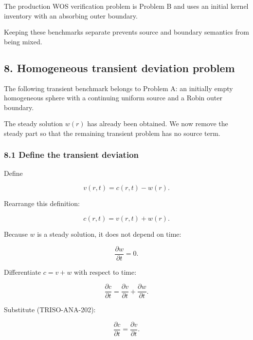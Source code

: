 \documentclass[11pt,a4paper]{article}
\begin{document}
The production WOS verification problem is Problem B and uses an initial kernel inventory with an absorbing outer boundary.

Keeping these benchmarks separate prevents source and boundary semantics from being mixed.

\subsection*{8. Homogeneous transient deviation problem}

The following transient benchmark belongs to Problem A: an initially empty homogeneous sphere with a continuing uniform source and a Robin outer boundary.

The steady solution $w(r)$ has already been obtained. We now remove the steady part so that the remaining transient problem has no source term.

\subsubsection*{8.1 Define the transient deviation}

Define

\begin{equation}
v(r,t)=c(r,t)-w(r).
\tag{TRISO-ANA-200}
\label{eq:triso-ana-200}
\end{equation}

Rearrange this definition:

\begin{equation}
c(r,t)=v(r,t)+w(r).
\tag{TRISO-ANA-201}
\label{eq:triso-ana-201}
\end{equation}

Because $w$ is a steady solution, it does not depend on time:

\begin{equation}
\frac{\partial w}{\partial t}=0.
\tag{TRISO-ANA-202}
\label{eq:triso-ana-202}
\end{equation}

Differentiate $c=v+w$ with respect to time:

\begin{equation}
\frac{\partial c}{\partial t}
=
\frac{\partial v}{\partial t}
+
\frac{\partial w}{\partial t}.
\tag{TRISO-ANA-203}
\label{eq:triso-ana-203}
\end{equation}

Substitute (TRISO-ANA-202):

\begin{equation}
\boxed{
\frac{\partial c}{\partial t}
=
\frac{\partial v}{\partial t}.
}
\tag{TRISO-ANA-204}
\label{eq:triso-ana-204}
\end{equation}
\end{document}
